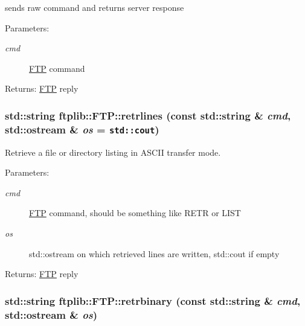 sends raw command and returns server response 

\begin{Desc}
\item[Parameters:]
\begin{description}
\item[{\em cmd}]\hyperlink{classftplib_1_1FTP}{FTP} command \end{description}
\end{Desc}
\begin{Desc}
\item[Returns:]\hyperlink{classftplib_1_1FTP}{FTP} reply \end{Desc}
\hypertarget{classftplib_1_1FTP_b04e374d4835e124959cee085df3fa4e}{
\subsubsection{\setlength{\rightskip}{0pt plus 5cm}std::string ftplib::FTP::retrlines (const std::string \& {\em cmd}, \/  std::ostream \& {\em os} = {\tt std::cout})}}
\label{classftplib_1_1FTP_b04e374d4835e124959cee085df3fa4e}


Retrieve a file or directory listing in ASCII transfer mode. 

\begin{Desc}
\item[Parameters:]
\begin{description}
\item[{\em cmd}]\hyperlink{classftplib_1_1FTP}{FTP} command, should be something like RETR or LIST \item[{\em os}]std::ostream on which retrieved lines are written, std::cout if empty \end{description}
\end{Desc}
\begin{Desc}
\item[Returns:]\hyperlink{classftplib_1_1FTP}{FTP} reply \end{Desc}
\hypertarget{classftplib_1_1FTP_ad060fdb45fec7ccd5949e475df96982}{
\subsubsection{\setlength{\rightskip}{0pt plus 5cm}std::string ftplib::FTP::retrbinary (const std::string \& {\em cmd}, \/  std::ostream \& {\em os})}}
\label{classftplib_1_1FTP_ad060fdb45fec7ccd5949e475df96982}


